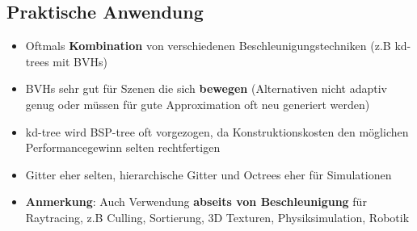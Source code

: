 \subsection{Praktische Anwendung}%
\label{ds:sub:praktische_anwendung}

\begin{itemize}
	\item Oftmals \textbf{Kombination} von verschiedenen Beschleunigungstechniken (z.B kd-trees mit BVHs)
	\item BVHs sehr gut für Szenen die sich \textbf{bewegen} (Alternativen nicht adaptiv genug oder müssen für gute Approximation oft neu generiert werden)
	\item kd-tree wird BSP-tree oft vorgezogen, da Konstruktionskosten den möglichen Performancegewinn selten rechtfertigen
	\item Gitter eher selten, hierarchische Gitter und Octrees eher für Simulationen
	\item \textbf{Anmerkung}: Auch Verwendung \textbf{abseits von Beschleunigung} für Raytracing, z.B Culling, Sortierung, 3D Texturen, Physiksimulation, Robotik
\end{itemize}